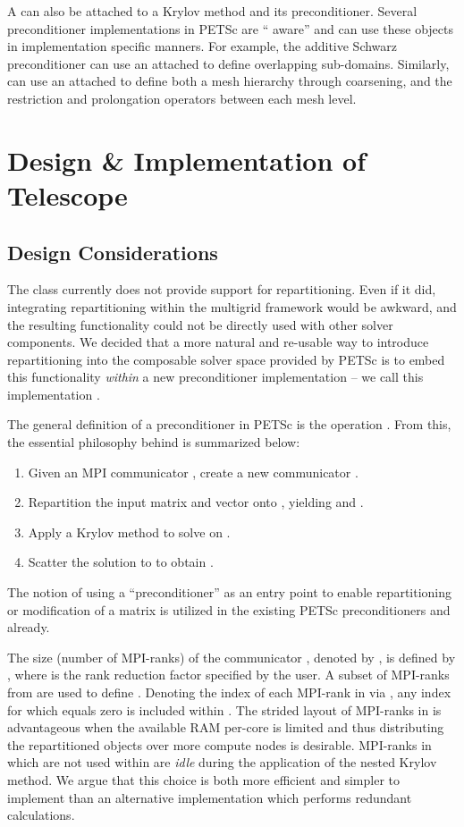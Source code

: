 \documentclass[]{siamart0216}
\begin{document}
A  can also be attached to a Krylov method and its preconditioner. 
Several preconditioner implementations in PETSc are `` aware'' and can use these objects in 
implementation specific manners. For example, the additive Schwarz preconditioner can use an attached  
to define overlapping sub-domains. Similarly,  can use an attached  to define both a mesh 
hierarchy through coarsening, and the restriction and prolongation operators between each mesh level. 

\section{Design \& Implementation of Telescope}

\subsection{Design Considerations}
The  class currently does not provide support for repartitioning.
Even if it did, integrating repartitioning within the multigrid framework would be 
awkward, and the resulting functionality could not be directly used with other solver components. 
We decided that a more natural and re-usable way to introduce repartitioning into the  
composable solver space provided by PETSc is to embed this 
functionality \textit{within} a new preconditioner implementation -- we
call this implementation .

The general definition of a preconditioner in PETSc is the operation .
From this, the essential philosophy behind  is summarized below: 
\begin{enumerate}
\setlength\itemsep{0em}
\item Given an MPI communicator , create a new communicator .
\item Repartition the input matrix  and vector  onto , yielding  and . 
\item Apply a Krylov method to solve  on .
\item Scatter the solution  to  to obtain .
\end{enumerate}
The notion of using a ``preconditioner'' as an entry point to enable repartitioning or modification of a matrix 
is utilized in the existing PETSc preconditioners  and  already.





The size (number of MPI-ranks) of the communicator , denoted by , 
is defined by , where  is the rank reduction factor specified by the user. 
A subset of MPI-ranks from  are used to define .
Denoting the index of each MPI-rank in  via , 
any index for which   equals zero is included within .
The strided layout of MPI-ranks in  is advantageous when the available RAM per-core 
is limited and thus distributing the repartitioned objects  over more compute nodes is desirable.
MPI-ranks in  which are not used within  are \textit{idle} during the 
application of the nested Krylov method. 
We argue that this choice is both more efficient and simpler to implement than an alternative implementation 
which performs redundant calculations. 
\end{document}
